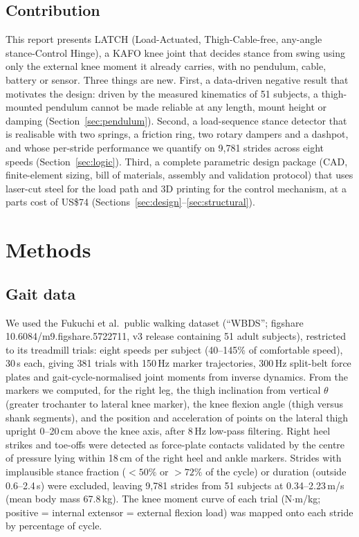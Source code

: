 \documentclass[11pt,a4paper]{article}
\begin{document}
\subsection{Contribution}
This report presents LATCH (Load-Actuated, Thigh-Cable-free, any-angle stance-Control Hinge), a KAFO knee joint that decides stance from swing using only the external knee moment it already carries, with no pendulum, cable, battery or sensor. Three things are new. First, a data-driven negative result that motivates the design: driven by the measured kinematics of 51 subjects, a thigh-mounted pendulum cannot be made reliable at any length, mount height or damping (Section~\ref{sec:pendulum}). Second, a load-sequence stance detector that is realisable with two springs, a friction ring, two rotary dampers and a dashpot, and whose per-stride performance we quantify on 9{,}781 strides across eight speeds (Section~\ref{sec:logic}). Third, a complete parametric design package (CAD, finite-element sizing, bill of materials, assembly and validation protocol) that uses laser-cut steel for the load path and 3D printing for the control mechanism, at a parts cost of US\$74 (Sections~\ref{sec:design}--\ref{sec:structural}).

\section{Methods}
\subsection{Gait data}
We used the Fukuchi et al.\ public walking dataset \cite{fukuchi2018} (``WBDS''; figshare 10.6084/m9.figshare.5722711, v3 release containing 51 adult subjects), restricted to its treadmill trials: eight speeds per subject (40--145\% of comfortable speed), 30\,s each, giving 381 trials with 150\,Hz marker trajectories, 300\,Hz split-belt force plates and gait-cycle-normalised joint moments from inverse dynamics. From the markers we computed, for the right leg, the thigh inclination from vertical $\theta$ (greater trochanter to lateral knee marker), the knee flexion angle (thigh versus shank segments), and the position and acceleration of points on the lateral thigh upright 0--20\,cm above the knee axis, after 8\,Hz low-pass filtering. Right heel strikes and toe-offs were detected as force-plate contacts validated by the centre of pressure lying within 18\,cm of the right heel and ankle markers. Strides with implausible stance fraction ($<50\%$ or $>72\%$ of the cycle) or duration (outside 0.6--2.4\,s) were excluded, leaving 9{,}781 strides from 51 subjects at 0.34--2.23\,m/s (mean body mass 67.8\,kg). The knee moment curve of each trial (N$\cdot$m/kg; positive = internal extensor = external flexion load) was mapped onto each stride by percentage of cycle.
\end{document}
